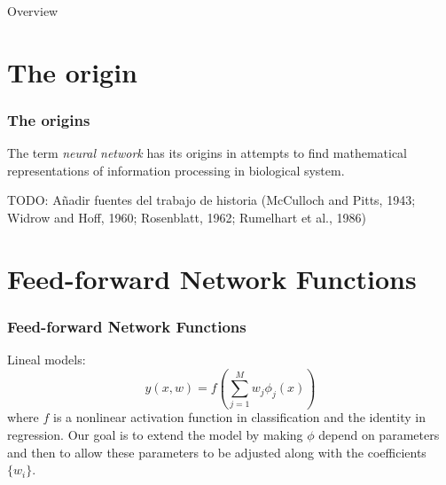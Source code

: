 


\begin{frame}{Overview}
  \tableofcontents
\end{frame}

\section{The origin}
\begin{frame}
  \frametitle{The origins}
  The term \textit{neural network} has its origins
  in attempts to find mathematical 
  representations of information processing in 
  biological system. 
  
  TODO: Añadir fuentes del trabajo de historia
  (McCulloch and Pitts, 1943; Widrow and Hoff, 1960; Rosenblatt, 1962; Rumelhart et al., 1986)
\end{frame}

\section{Feed-forward Network Functions}

\begin{frame}
  \frametitle{Feed-forward Network Functions}
  Lineal models: 
  \begin{equation}
    y(x,w) = 
    f 
    \left(
      \sum_{j = 1}^M
      w_j \phi_j(x)
    \right)
  \end{equation}
where $f$ is a nonlinear activation function in classification 
and the identity in regression. 
Our goal is to extend the model by making $\phi$ 
depend on parameters and then to allow these parameters 
to be adjusted along with the coefficients $\{w_i\}$. 
\end{frame}


